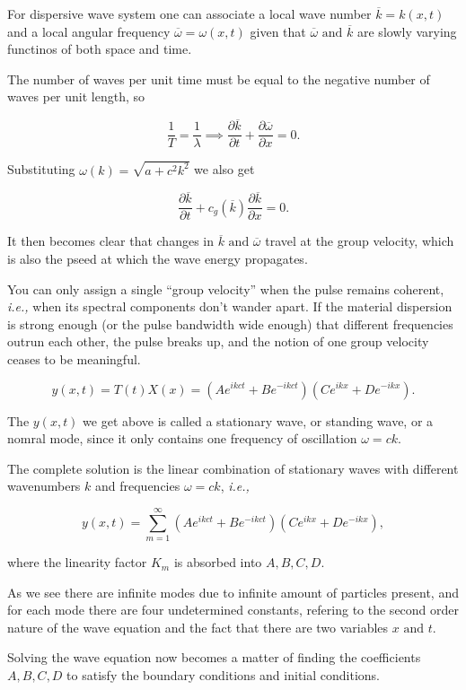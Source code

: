 For dispersive wave system one can associate a local wave number \(\overline{k} = k(x,t)\) and a local angular frequency \(\overline{\omega } = \omega (x,t)\) given that \(\overline{\omega } \text { and } \overline{k} \) are slowly varying functinos of both space and time. 

The number of waves per unit time must be equal to the negative number of waves per unit length, so 

\begin{equation}
	\frac{1}{T} = \frac{1}{\lambda } \implies \frac{\partial \overline{k} }{\partial t} + \frac{\partial \overline{\omega } }{\partial x} = 0.    
\end{equation}

Substituting \(\omega (k) = \sqrt{a+c^2k^2} \) we also get

\begin{equation}
	\frac{\partial \overline{k} }{\partial t} + c_{g}(\overline{k} )\frac{\partial \overline{k} }{\partial x} = 0.   
\end{equation}

It then becomes clear that changes in \(\overline{k} \text { and } \overline{\omega }  \) travel at the group velocity, which is also the pseed at which the wave energy propagates. 

You can only assign a single ``group velocity'' when the pulse remains coherent, \textit{i.e.,} when its spectral components don't wander apart. If the material dispersion is strong enough (or the pulse bandwidth wide enough) that different frequencies outrun each other, the pulse breaks up, and the notion of one group velocity ceases to be meaningful.

\begin{equation}\label{ThetaQ}   
	y(x,t) = T(t)X(x) = \left( Ae^{ik ct}+Be^{-ik ct}    \right)\left( Ce^{i k x}+De^{-i k x}   \right). 
\end{equation}

The \(y(x,t)\) we get above is called a stationary wave, or standing wave, or a nomral mode, since it only contains one frequency of oscillation \(\omega = ck\). 

The complete solution is the linear combination of stationary waves with different wavenumbers \(k\) and frequencies \(\omega = ck\), \textit{i.e.,} 

\begin{equation}
	y(x,t) = \sum_{m=1}^{\infty}  \left( Ae^{ik ct}+Be^{-ik ct}    \right)\left( Ce^{i k x}+De^{-i k x}   \right),
\end{equation}

where the linearity factor \(K_{m} \) is absorbed into \(A,B,C,D\). 

As we see there are infinite modes due to infinite amount of particles present, and for each mode there are four undetermined constants, refering to the second order nature of the wave equation and the fact that there are two variables \(x \text { and } t\). 

Solving the wave equation now becomes a matter of finding the coefficients \(A, B, C, D\) to satisfy the boundary conditions and initial conditions. 
